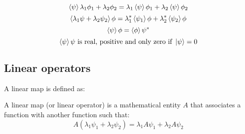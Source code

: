 \begin{equation}
    \braket{\psi}{\lambda_1\phi_1+\lambda_2\phi_2} = \lambda_1\braket{\psi}{\phi_1} + \lambda_2\braket{\psi}{\phi_2}
\end{equation}
\begin{equation}
    \braket{\lambda_1\psi+\lambda_2\psi_2}{\phi} = \lambda_1^*\braket{\psi_1}{\phi} + \lambda_2^*\braket{\psi_2}{\phi}
\end{equation}
\begin{equation}
    \braket{\psi}{\phi} = \braket{\phi}{\psi}^*
\end{equation}
\begin{equation}
    \braket{\psi}{\psi}\text{ is real, positive and only zero if }\ket{\psi} = 0
\end{equation}


\subsection{Linear operators} \label{sec:lin-ops}

A linear map is defined as:

\begin{definition} \label{linear_map}
    A linear map (or linear operator) is a mathematical entity $A$ that associates a function with another function such that:
    \begin{equation}
        A (\lambda_1\psi_1 + \lambda_2\psi_2) = \lambda_1 A\psi_1 + \lambda_2 A\psi_2
    \end{equation}
\end{definition}


